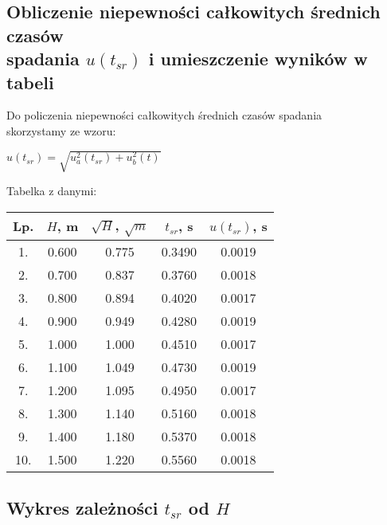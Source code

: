 \documentclass[12pt]{article}
\begin{document}
\subsection*{Obliczenie niepewności całkowitych średnich czasów  \\
    spadania $u(t_{sr})$ i umieszczenie wyników w tabeli}

Do policzenia niepewności całkowitych średnich czasów spadania \\
skorzystamy ze wzoru:
\begin{center}
    $u(t_{sr}) = \sqrt{u_a^2(t_{sr}) + u_b^2(t)}$
\end{center}
Tabelka z danymi:
\begin{center}
    \begin{tabular} { | c | c | c | c | c | }
        \hline
        Lp. & $H$, m & $\sqrt{H}$, $\sqrt{m}$ & $t_{sr}$, s & $u(t_{sr})$, s \\
        \hline
        1.  & 0.600  & 0.775                  & 0.3490      & 0.0019         \\
        \hline
        2.  & 0.700  & 0.837                  & 0.3760      & 0.0018         \\
        \hline
        3.  & 0.800  & 0.894                  & 0.4020      & 0.0017         \\
        \hline
        4.  & 0.900  & 0.949                  & 0.4280      & 0.0019         \\
        \hline
        5.  & 1.000  & 1.000                  & 0.4510      & 0.0017         \\
        \hline
        6.  & 1.100  & 1.049                  & 0.4730      & 0.0019         \\
        \hline
        7.  & 1.200  & 1.095                  & 0.4950      & 0.0017         \\
        \hline
        8.  & 1.300  & 1.140                  & 0.5160      & 0.0018         \\
        \hline
        9.  & 1.400  & 1.180                  & 0.5370      & 0.0018         \\
        \hline
        10. & 1.500  & 1.220                  & 0.5560      & 0.0018         \\
        \hline
    \end{tabular}
\end{center}

\subsection*{Wykres zależności $t_{sr}$ od $H$}
\end{document}

